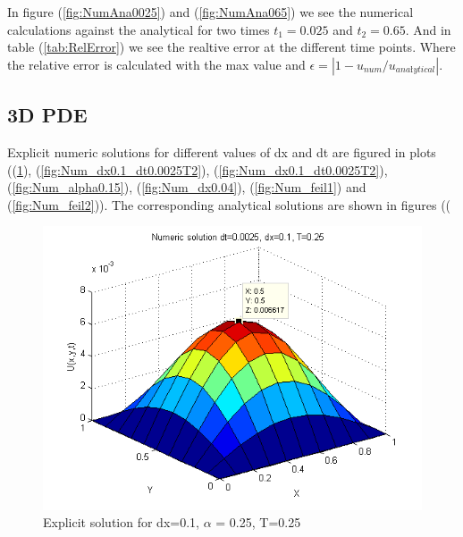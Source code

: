 \documentclass[a4paper,10pt]{article}
\begin{document}
In figure (\ref{fig:NumAna0025}) and (\ref{fig:NumAna065}) we see the numerical calculations against the analytical for two times $t_1 = 0.025$
and $t_2 = 0.65$. And in table (\ref{tab:RelError}) we see the realtive error at the different time points. Where the relative error is
calculated with the max value and $\epsilon = |1-u_{num}/u_{anałytical}|$.

\subsection{3D PDE}
Explicit numeric solutions for different values of dx and dt are figured in plots ((\ref{fig:Num_dx0.1_dt0.0025T1}), (\ref{fig:Num_dx0.1_dt0.0025T2}), (\ref{fig:Num_dx0.1_dt0.0025T2}), (\ref{fig:Num_alpha0.15}), (\ref{fig:Num_dx0.04}), (\ref{fig:Num_feil1}) and (\ref{fig:Num_feil2})).
The corresponding analytical solutions are shown in figures ((

\begin{figure}
  \begin{center}
    \includegraphics[scale=0.5]{num_dt00025_dx01_T025}
    \caption{Explicit solution for dx=0.1, $\alpha$ = 0.25, T=0.25}
    \label{fig:Num_dx0.1_dt0.0025T1}
  \end{center}

\end{figure}
\end{document}
